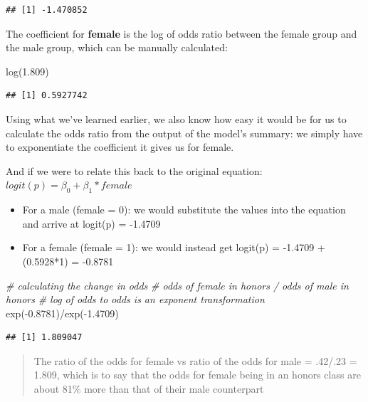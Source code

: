 \documentclass[
]{article}
\newenvironment{Shaded}{\begin{snugshade}}{\end{snugshade}}
\newcommand{\CommentTok}[1]{\textcolor[rgb]{0.56,0.35,0.01}{\textit{#1}}}
\newcommand{\FloatTok}[1]{\textcolor[rgb]{0.00,0.00,0.81}{#1}}
\newcommand{\FunctionTok}[1]{\textcolor[rgb]{0.00,0.00,0.00}{#1}}
\newcommand{\NormalTok}[1]{#1}
\newcommand{\SpecialCharTok}[1]{\textcolor[rgb]{0.00,0.00,0.00}{#1}}
\providecommand{\tightlist}{%
  \setlength{\itemsep}{0pt}\setlength{\parskip}{0pt}}
\begin{document}
\begin{verbatim}
## [1] -1.470852
\end{verbatim}

The coefficient for \textbf{female} is the log of odds ratio between the
female group and the male group, which can be manually calculated:

\begin{Shaded}
\begin{Highlighting}[]
\FunctionTok{log}\NormalTok{(}\FloatTok{1.809}\NormalTok{)}
\end{Highlighting}
\end{Shaded}

\begin{verbatim}
## [1] 0.5927742
\end{verbatim}

Using what we've learned earlier, we also know how easy it would be for
us to calculate the odds ratio from the output of the model's summary:
we simply have to exponentiate the coefficient it gives us for female.

And if we were to relate this back to the original equation:
\(logit(p) = \beta_0 + \beta_1 * female\)

\begin{itemize}
\tightlist
\item
  For a male (female = 0): we would substitute the values into the
  equation and arrive at logit(p) = -1.4709\\
\item
  For a female (female = 1): we would instead get logit(p) = -1.4709 +
  (0.5928*1) = -0.8781
\end{itemize}

\begin{Shaded}
\begin{Highlighting}[]
\CommentTok{\# calculating the change in odds}
\CommentTok{\# odds of female in honors / odds of male in honors}
\CommentTok{\# log of odds to odds is an exponent transformation}
\FunctionTok{exp}\NormalTok{(}\SpecialCharTok{{-}}\FloatTok{0.8781}\NormalTok{)}\SpecialCharTok{/}\FunctionTok{exp}\NormalTok{(}\SpecialCharTok{{-}}\FloatTok{1.4709}\NormalTok{)}
\end{Highlighting}
\end{Shaded}

\begin{verbatim}
## [1] 1.809047
\end{verbatim}

\begin{quote}
The ratio of the odds for female vs ratio of the odds for male = .42/.23
= 1.809, which is to say that the odds for female being in an honors
class are about 81\% more than that of their male counterpart
\end{quote}
\end{document}
